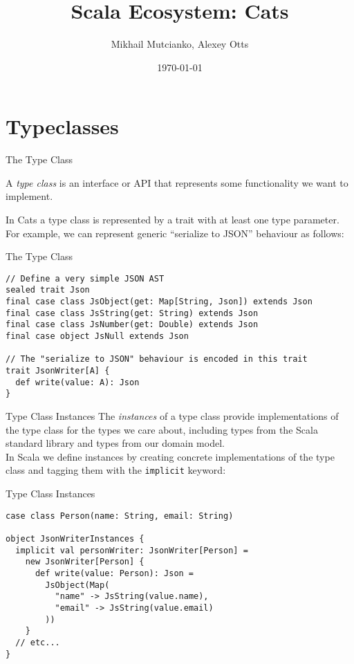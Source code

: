 \documentclass[aspectratio=169]{beamer}
\title{Scala Ecosystem: Cats}
\author{Mikhail Mutcianko, Alexey Otts}
\institute{СПБгУ, СП}
\date{\today}
\begin{document}
\frame{\titlepage}

\section{Typeclasses}

\begin{frame}[fragile]{The Type Class}
  \begin{block}{}
    A \textit{type class} is an interface or API that represents some functionality we want to implement.
  \end{block}
 In Cats a type class is represented by a trait with at least one type parameter. For example, we can
  represent generic “serialize to JSON” behaviour as follows:
\end{frame}

\begin{frame}[fragile]{The Type Class}
\begin{verbatim}
// Define a very simple JSON AST
sealed trait Json
final case class JsObject(get: Map[String, Json]) extends Json
final case class JsString(get: String) extends Json
final case class JsNumber(get: Double) extends Json
final case object JsNull extends Json

// The "serialize to JSON" behaviour is encoded in this trait
trait JsonWriter[A] {
  def write(value: A): Json
}
\end{verbatim}
\end{frame}

\begin{frame}{Type Class Instances}
  The \textit{instances} of a type class provide implementations of the type class for the types we care
  about, including types from the Scala standard library and types from our domain model. \\

  In Scala we define instances by creating concrete implementations of the type class and tagging
  them with the \texttt{implicit} keyword:
\end{frame}

\begin{frame}[fragile]{Type Class Instances}
\begin{verbatim}
case class Person(name: String, email: String)

object JsonWriterInstances {
  implicit val personWriter: JsonWriter[Person] =
    new JsonWriter[Person] {
      def write(value: Person): Json =
        JsObject(Map(
          "name" -> JsString(value.name),
          "email" -> JsString(value.email)
        ))
    }
  // etc...
}
\end{verbatim}
\end{frame}
\end{document}
